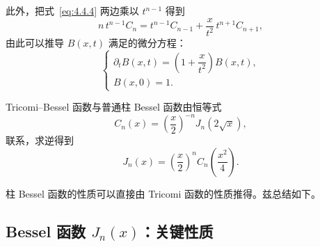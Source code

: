 此外，把式~\eqref{eq:4.4.4} 两边乘以 $t^{n-1}$ 得到
\begin{equation}
n\,t^{n-1} C_n = t^{n-1} C_{n-1} + \frac{x}{t^2}\,t^{n+1} C_{n+1},
\label{eq:4.4.11}
\end{equation}
由此可以推导 $B(x,t)$ 满足的微分方程：
\begin{equation}
\begin{cases}
\partial_t B(x,t) = \left(1 + \dfrac{x}{t^2}\right) B(x,t),\\[4pt]
B(x,0) = 1.
\end{cases}
\label{eq:4.4.12}
\end{equation}

Tricomi--Bessel 函数与普通柱 Bessel 函数由恒等式
\begin{equation}
C_n(x) = \left(\frac{x}{2}\right)^{-n} J_n\!\left(2\sqrt{x}\right),
\label{eq:4.4.13}
\end{equation}
联系，求逆得到
\begin{equation}
J_n(x) = \left(\frac{x}{2}\right)^{\!n}
C_n\!\left(\frac{x^2}{4}\right).
\label{eq:4.4.14}
\end{equation}

柱 Bessel 函数的性质可以直接由 Tricomi 函数的性质推得。兹总结如下。

\subsection*{Bessel 函数 $J_n(x)$：关键性质}

